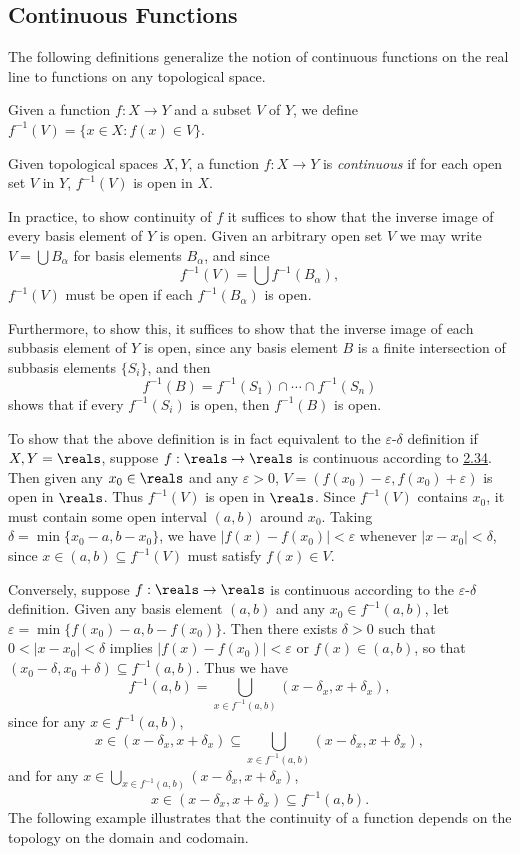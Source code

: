 \subsection{Continuous Functions}
The following definitions generalize the notion of continuous functions on the real line to functions on any topological space.

Given a function $f:X \rightarrow Y$ and a subset $V$ of $Y$, we define $f^{-1}(V) = \{x \in X: f(x) \in V\}$.
\begin{definition}\label{2.34}
    Given topological spaces $X, Y$, a function $f: X\rightarrow Y$ is {\it continuous} if for each open set $V$ in $Y$, $f^{-1}(V)$ is open in $X$.
\end{definition}
In practice, to show continuity of $f$ it suffices to show that the inverse image of every basis element of $Y$ is open. Given an arbitrary open set $V$ we may write $V = \bigcup B_\alpha$ for basis elements $B_\alpha$, and since
$$f^{-1} (V) = \bigcup f^{-1}(B_\alpha),$$
$f^{-1}(V)$ must be open if each $f^{-1}(B_\alpha)$ is open.

Furthermore, to show this, it suffices to show that the inverse image of each subbasis element of $Y$ is open, since any basis element $B$ is a finite intersection of subbasis elements $\{S_i\}$, and then
$$f^{-1}(B) = f^{-1}(S_1) \cap \cdots \cap f^{-1}(S_n)$$
shows that if every $f^{-1}(S_i)$ is open, then $f^{-1}(B)$ is open.

To show that the above definition is in fact equivalent to the $\varepsilon$-$\delta$ definition if $X, Y = \reals$, suppose $f: \reals \rightarrow \reals$ is continuous according to \hyperref[2.34]{2.34}. Then given any $x_0 \in \reals$ and any $\varepsilon > 0$, $V = (f(x_0)-\varepsilon, f(x_0)+\varepsilon)$ is open in $\reals$. Thus $f^{-1}(V)$ is open in $\reals$. Since $f^{-1}(V)$ contains $x_0$, it must contain some open interval $(a, b)$ around $x_0$. Taking $\delta = \min\{x_0-a, b-x_0\}$, we have $|f(x) - f(x_0)| < \varepsilon$ whenever $|x-x_0| < \delta$, since $x \in (a, b) \subseteq f^{-1}(V)$ must satisfy $f(x) \in V$.

Conversely, suppose $f: \reals \rightarrow \reals$ is continuous according to the $\varepsilon$-$\delta$ definition. Given any basis element $(a, b)$ and any $x_0 \in f^{-1}(a, b)$, let $\varepsilon = \min\{f(x_0)-a, b-f(x_0)\}$. Then there exists $\delta > 0$ such that $0< |x-x_0| < \delta$ implies $|f(x) - f(x_0)| < \varepsilon$ or $f(x) \in (a, b)$, so that $(x_0 - \delta, x_0 + \delta) \subseteq f^{-1}(a, b)$. Thus we have
$$f^{-1}(a, b) = \bigcup_{x \in f^{-1}(a, b)} (x - \delta_x, x + \delta_x),$$
since for any $x \in f^{-1}(a, b)$, 
$$x \in (x - \delta_x, x + \delta_x) \subseteq \bigcup_{x \in f^{-1}(a, b)} (x - \delta_x, x + \delta_x),$$
and for any $x \in \bigcup_{x \in f^{-1}(a, b)} (x - \delta_x, x + \delta_x)$, 
$$x \in (x - \delta_x, x + \delta_x) \subseteq f^{-1}(a, b).$$
The following example illustrates that the continuity of a function depends on the topology on the domain and codomain.

